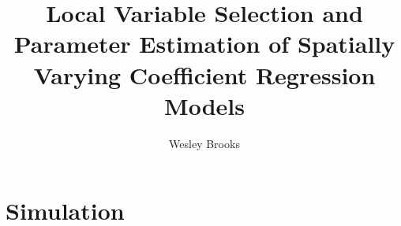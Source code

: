 \documentclass[authoryear, review, 11pt]{elsarticle}
\title{Local Variable Selection and Parameter Estimation of Spatially Varying Coefficient Regression Models}
\author{Wesley Brooks}
\date{}                                           %
\begin{document}
\maketitle

\section{Simulation \label{sec:simulation}}

\end{document}

